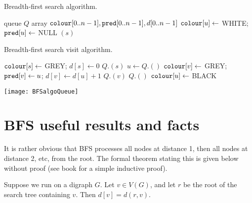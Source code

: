 \begin{algorithm}[H]
  \caption{Breadth-first search algorithm.}
    \label{alg:BFScode}
\begin{algorithmic}[1]
	\State queue $Q$  
	\State array $\colour[0..n-1], \pred[0..n-1], d[0..n-1]$
		\State $\colour[u] \gets $ WHITE; $\pred[u] \gets $ NULL
	\EndFor
			\State {}$(s)$
		\EndIf
	\EndFor
	\State {}
\EndFunction
\end{algorithmic}
\end{algorithm}

\begin{algorithm}[H]
  \caption{Breadth-first search visit algorithm.}
     \label{alg:BFSvisitcode}
  \begin{algorithmic}[1]
	\State $\colour[s] \gets $ GREY; $d[s] \gets 0$ 
	\State $Q$.$(s)$
		\State $u \gets Q$.$()$
				\State $\colour[v] \gets $ GREY; $\pred[v] \gets u$; $d[v] \gets d[u]+1$
				\State $Q$.$(v)$
			\EndIf
		\EndFor
		\State $Q$.$()$
		\State $\colour[u] \gets $ BLACK
	\EndWhile
\EndFunction
\end{algorithmic}
\end{algorithm}

\begin{Boxample}
\begin{center}
\texttt{[image: BFSalgoQueue]}
\end{center}
\end{Boxample}


\section{BFS useful results and facts} 
It is rather obvious that BFS processes all nodes at distance 1, then
all nodes at distance 2, etc, from the root. 
The formal theorem stating this is given below without proof (see book for a simple inductive proof).

\begin{Theorem} \label{thm:BFSdist}
Suppose we run  on a digraph $G$.
Let $v\in V(G)$, and let $r$ be the root of the search tree containing $v$. 
Then $d[v] = d(r, v)$.
\end{Theorem}

